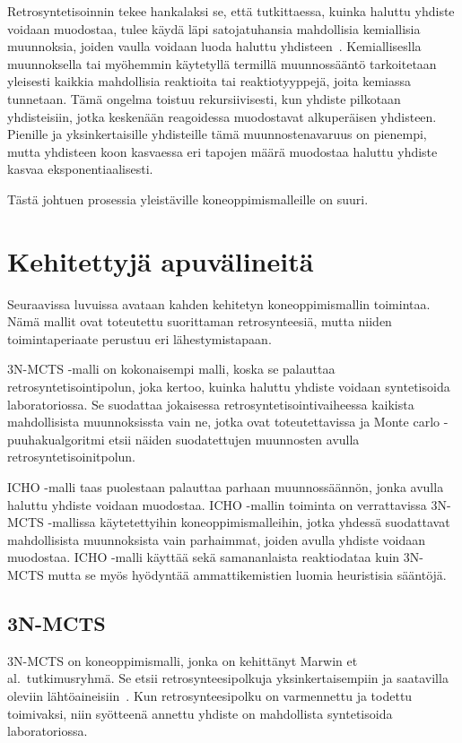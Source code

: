 \documentclass[finnish,twoside,censored,tkt,sw-line]{HYthesisML}
\begin{document}
Retrosyntetisoinnin tekee hankalaksi se, että tutkittaessa, kuinka haluttu yhdiste voidaan muodostaa, tulee käydä läpi satojatuhansia mahdollisia kemiallisia muunnoksia, joiden vaulla voidaan luoda haluttu yhdisteen~\cite{SeglerMarwinHS2018Pcsw}.
Kemialliseslla muunnoksella tai myöhemmin käytetyllä termillä muunnossääntö tarkoitetaan yleisesti kaikkia mahdollisia reaktioita tai reaktiotyyppejä, joita kemiassa tunnetaan.
Tämä ongelma toistuu rekursiivisesti, kun yhdiste pilkotaan yhdisteisiin, jotka keskenään reagoidessa muodostavat alkuperäisen yhdisteen.
Pienille ja yksinkertaisille yhdisteille tämä muunnostenavaruus on pienempi, mutta yhdisteen koon kasvaessa eri tapojen määrä muodostaa haluttu yhdiste kasvaa eksponentiaalisesti.

Tästä johtuen prosessia yleistäville koneoppimismalleille on suuri.

\section{Kehitettyjä apuvälineitä}

Seuraavissa luvuissa avataan kahden kehitetyn koneoppimismallin toimintaa.
Nämä mallit ovat toteutettu suorittaman retrosynteesiä, mutta niiden toimintaperiaate perustuu eri lähestymistapaan.

3N-MCTS -malli on kokonaisempi malli, koska se palauttaa retrosyntetisointipolun, joka kertoo, kuinka haluttu yhdiste voidaan syntetisoida laboratoriossa.
Se suodattaa jokaisessa retrosyntetisointivaiheessa kaikista mahdollisista muunnoksissta vain ne, jotka ovat toteutettavissa ja Monte carlo -puuhakualgoritmi etsii näiden suodatettujen muunnosten avulla retrosyntetisoinitpolun.

ICHO -malli taas puolestaan palauttaa parhaan muunnossäännön, jonka avulla haluttu yhdiste voidaan muodostaa.
ICHO -mallin toiminta on verrattavissa 3N-MCTS -mallissa käytetettyihin koneoppimismalleihin, jotka yhdessä suodattavat mahdollisista muunnoksista vain parhaimmat, joiden avulla yhdiste voidaan muodostaa.
ICHO -malli käyttää sekä samananlaista reaktiodataa kuin 3N-MCTS mutta se myös hyödyntää ammattikemistien luomia heuristisia sääntöjä.

\subsection{3N-MCTS}

3N-MCTS on koneoppimismalli, jonka on kehittänyt Marwin et al.\ tutkimusryhmä.
Se etsii retrosynteesipolkuja yksinkertaisempiin ja saatavilla oleviin lähtöaineisiin~\cite{SeglerMarwinHS2018Pcsw}.
Kun retrosynteesipolku on varmennettu ja todettu toimivaksi, niin syötteenä annettu yhdiste on mahdollista syntetisoida laboratoriossa.
\end{document}

